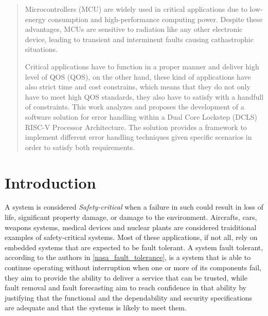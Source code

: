 \documentclass[10pt, a4paper]{report}
\begin{document}
\newpage

\begin{abstract}
    \thispagestyle{fancy}
    Microcontrollers (\acrshort{MCU}) are widely used in critical applications 
    due to low-energy consumption and high-performance computing power. Despite 
    these advantages, \acrshort{MCU}s are sensitive to radiation like any other
    electronic device, leading to transient and interminent faults causing
    cathastrophic situations.

    Critical applications have to function in a proper manner and deliver high
    level of \acrlong{QOS} (\acrshort{QOS}), on the other hand, these kind of
    applications have also strict time and cost constrains, which means that
    they do not only have to meet high \acrshort{QOS} standards, they also have
    to satisfy with a handfull of constraints. This work analyzes and proposes 
    the development of a software solution for error handling within a Dual Core 
    Lockstep (\acrshort{DCLS}) RISC-V Processor Architecture. The solution 
    provides a framework to implement different error handling techniques given 
    specific scenarios in order to satisfy both requirements.
\end{abstract}

\newpage
\begin{tableofcontents}
    \thispagestyle{fancy}
\end{tableofcontents}

\newpage

\chapter{Introduction}

\thispagestyle{fancy}
A system is considered \emph{Safety-critical} when a failure in such could
result in loss of life, significant property damage, or damage to the
environment. Aircrafts, cars, weapons systems, medical devices and nuclear 
plants are considered traiditional examples of safety-critical systems. Most of 
these applications, if not all, rely on embedded systems that are expected to be 
fault tolerant. A system fault tolerant, according to the authors in 
\ref{nasa_fault_tolerance}, is a system that is able to continue operating 
without interruption when one or more of its components fail, they aim 
to provide the ability to deliver a service that can be trusted, while fault 
removal and fault forecasting aim to reach confidence in that ability by 
justifying that the functional and the dependability and security specifications 
are adequate and that the systems is likely to meet them.
\end{document}
